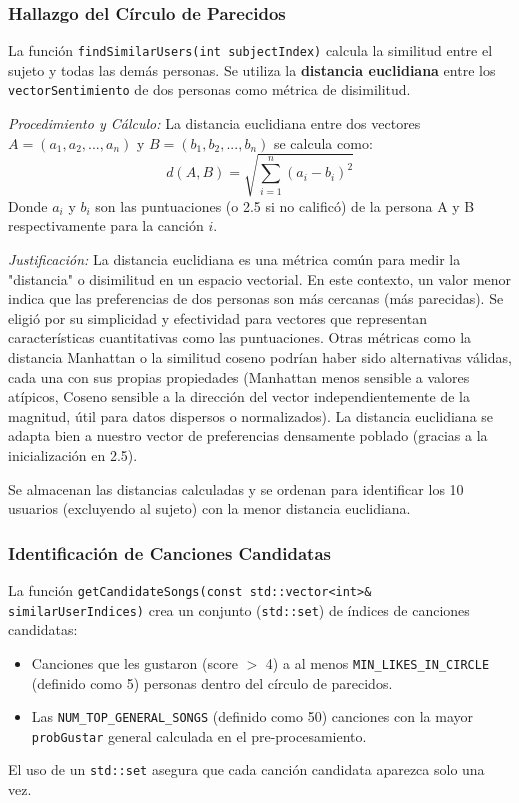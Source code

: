 \documentclass{article}
\begin{document}
\subsubsection{Hallazgo del Círculo de Parecidos}
La función \texttt{findSimilarUsers(int subjectIndex)} calcula la similitud entre el sujeto y todas las demás personas. Se utiliza la \textbf{distancia euclidiana} entre los \texttt{vectorSentimiento} de dos personas como métrica de disimilitud.

\vspace{0.5em} %
\noindent \textit{Procedimiento y Cálculo:} La distancia euclidiana entre dos vectores \(A = (a_1, a_2, ..., a_n)\) y \(B = (b_1, b_2, ..., b_n)\) se calcula como:
\[
d(A, B) = \sqrt{\sum_{i=1}^{n} (a_i - b_i)^2}
\]
Donde \(a_i\) y \(b_i\) son las puntuaciones (o 2.5 si no calificó) de la persona A y B respectivamente para la canción \(i\).

\vspace{0.5em} %
\noindent \textit{Justificación:} La distancia euclidiana es una métrica común para medir la "distancia" o disimilitud en un espacio vectorial. En este contexto, un valor menor indica que las preferencias de dos personas son más cercanas (más parecidas). Se eligió por su simplicidad y efectividad para vectores que representan características cuantitativas como las puntuaciones. Otras métricas como la distancia Manhattan o la similitud coseno podrían haber sido alternativas válidas, cada una con sus propias propiedades (Manhattan menos sensible a valores atípicos, Coseno sensible a la dirección del vector independientemente de la magnitud, útil para datos dispersos o normalizados). La distancia euclidiana se adapta bien a nuestro vector de preferencias densamente poblado (gracias a la inicialización en 2.5).

Se almacenan las distancias calculadas y se ordenan para identificar los 10 usuarios (excluyendo al sujeto) con la menor distancia euclidiana.

\subsubsection{Identificación de Canciones Candidatas}
La función \texttt{getCandidateSongs(const std::vector<int>\& similarUserIndices)} crea un conjunto (\texttt{std::set}) de índices de canciones candidatas:
\begin{itemize}[label=\textbullet]
    \item Canciones que les gustaron (score $>$ 4) a al menos \texttt{MIN\_LIKES\_IN\_CIRCLE} (definido como 5) personas dentro del círculo de parecidos.
    \item Las \texttt{NUM\_TOP\_GENERAL\_SONGS} (definido como 50) canciones con la mayor \texttt{probGustar} general calculada en el pre-procesamiento.
\end{itemize}
El uso de un \texttt{std::set} asegura que cada canción candidata aparezca solo una vez.
\end{document}
